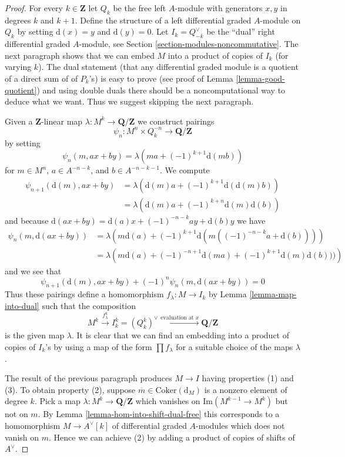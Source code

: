 \begin{proof}
For every $k \in \mathbf{Z}$ let $Q_k$ be the free left $A$-module with
generators $x, y$ in degrees $k$ and $k + 1$. Define the structure of a
left differential graded $A$-module on $Q_k$ by setting $\text{d}(x) = y$
and $\text{d}(y) = 0$. Let $I_k = Q_{-k}^\vee$ be the ``dual'' right
differential graded $A$-module, see
Section \ref{section-modules-noncommutative}.
The next paragraph shows that we can embed $M$ into a product
of copies of $I_k$ (for varying $k$). The dual statement (that any
differential graded module is a quotient of a direct sum of of $P_k$'s)
is easy to prove (see proof of Lemma \ref{lemma-good-quotient})
and using double duals there should be a noncomputational
way to deduce what we want. Thus we suggest skipping the next paragraph.

\medskip\noindent
Given a $\mathbf{Z}$-linear map $\lambda : M^k \to \mathbf{Q}/\mathbf{Z}$
we construct pairings
$$
\psi_n : M^n \times Q_k^{-n} \longrightarrow \mathbf{Q}/\mathbf{Z}
$$
by setting
$$
\psi_n(m, ax + by) = \lambda(ma + (-1)^{k + 1}\text{d}(mb))
$$
for $m \in M^n$, $a \in A^{-n - k}$, and $b \in A^{-n - k - 1}$. We compute
\begin{align*}
\psi_{n + 1}(\text{d}(m), ax + by)
& =
\lambda\left(\text{d}(m)a + (-1)^{k + 1}\text{d}(\text{d}(m)b)\right) \\
& =
\lambda\left(\text{d}(m)a + (-1)^{k + n}\text{d}(m)\text{d}(b)\right)
\end{align*}
and because
$\text{d}(ax + by) = \text{d}(a)x + (-1)^{-n - k}ay + \text{d}(b)y$ we have
\begin{align*}
\psi_n(m, \text{d}(ax + by))
& =
\lambda\left(
m\text{d}(a) + (-1)^{k + 1}\text{d}(m((-1)^{-n - k}a + \text{d}(b)))
\right) \\
& =
\lambda\left(
m\text{d}(a) + (-1)^{-n + 1}\text{d}(ma) + (-1)^{k + 1}\text{d}(m)\text{d}(b)))
\right)
\end{align*}
and we see that
$$
\psi_{n + 1}(\text{d}(m), ax + by) + (-1)^n\psi_n(m, \text{d}(ax + by)) = 0
$$
Thus these pairings define a homomorphism
$f_\lambda : M \to I_k$ by Lemma \ref{lemma-map-into-dual}
such that the composition
$$
M^k \xrightarrow{f^k_\lambda} I_k^k = (Q_k^k)^\vee
\xrightarrow{\text{evaluation at }x} \mathbf{Q}/\mathbf{Z}
$$
is the given map $\lambda$. It is clear that we can find an embedding
into a product of copies of $I_k$'s by using a map of the form
$\prod f_\lambda$ for a suitable choice of the maps $\lambda$.

\medskip\noindent
The result of the previous paragraph produces $M \to I$
having properties (1) and (3). To obtain property (2), suppose
$\overline{m} \in \text{Coker}(\text{d}_M)$ is a nonzero element of
degree $k$. Pick a map $\lambda : M^k \to \mathbf{Q}/\mathbf{Z}$
which vanishes on $\text{Im}(M^{k - 1} \to M^k)$ but not on $m$. By
Lemma \ref{lemma-hom-into-shift-dual-free}
this corresponds to a homomorphism $M \to A^\vee[k]$ of
differential graded $A$-modules which does not vanish on $m$.
Hence we can achieve (2) by adding
a product of copies of shifts of $A^\vee$.
\end{proof}

